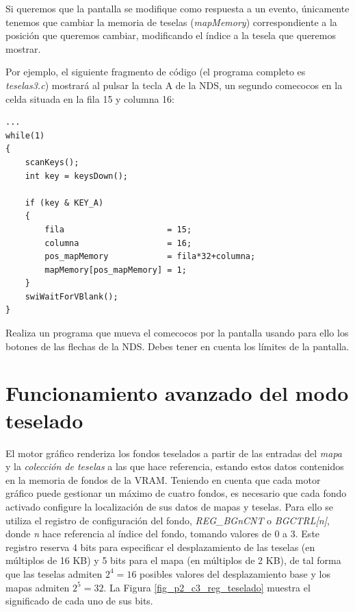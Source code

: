 Si queremos que la pantalla se modifique como respuesta a un evento, únicamente tenemos que cambiar la memoria de teselas (\textit{mapMemory}) correspondiente a la posición que queremos cambiar, modificando el índice a la tesela que queremos mostrar.

\begin{example}
Por ejemplo, el siguiente fragmento de código (el programa completo es \textit{teselas3.c}) mostrará al pulsar la tecla A de la NDS, un segundo comecocos en la celda situada en la fila 15 y columna 16:

\begin{lstlisting}
...
while(1)
{
	scanKeys();
	int key = keysDown();

	if (key & KEY_A)
	{
		fila                     = 15;
		columna                  = 16;
		pos_mapMemory            = fila*32+columna;
		mapMemory[pos_mapMemory] = 1;
	}
	swiWaitForVBlank();
}
\end{lstlisting}
\end{example}

\begin{exercise}
	Realiza un programa que mueva el comecocos por la pantalla usando para ello los botones de las flechas de la NDS. Debes tener en cuenta los límites de la pantalla.
\end{exercise}
	
	
\section{Funcionamiento avanzado del modo teselado}
El motor gráfico renderiza los fondos teselados a partir de las entradas del \textit{mapa} y la \textit{colección de teselas} a las que hace referencia, estando estos datos contenidos en la memoria de fondos de la VRAM. Teniendo en cuenta que cada motor gráfico puede gestionar un máximo de cuatro fondos, es necesario que cada fondo activado configure la localización de sus datos de mapas y teselas. Para ello se utiliza el registro de configuración del fondo, \textit{REG\_BGnCNT} o \textit{BGCTRL[n]}, donde \textit{n} hace referencia al índice del fondo, tomando valores de 0 a 3. Este registro reserva 4 bits para especificar el desplazamiento de las teselas (en múltiplos de 16 KB) y 5 bits para el mapa (en múltiplos de 2 KB), de tal forma que las teselas admiten $2^4 = 16$ posibles valores del desplazamiento base y los mapas admiten $2^5 = 32$. La Figura \ref{fig_p2_c3_reg_teselado} muestra el significado de cada uno de sus bits.


